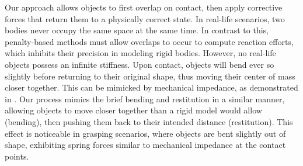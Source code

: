 Our approach allows objects to first overlap on contact, then apply corrective forces that return them to a physically correct state. In real-life scenarios, two bodies never occupy the same space at the same time. In contrast to this, penalty-based methods must allow overlaps to occur to compute reaction efforts, which inhibits their precision in modeling rigid bodies. However, no real-life objects possess an infinite stiffness. Upon contact, objects will bend ever so slightly before returning to their original shape, thus moving their center of mass closer together. This can be mimicked by mechanical impedance, as demonstrated in \cite{jain2011controlling}. Our process mimics the brief bending and restitution in a similar manner, allowing objects to move closer together than a rigid model would allow (bending), then pushing them back to their intended distance (restitution). This effect is noticeable in grasping scenarios, where objects are bent slightly out of shape, exhibiting spring forces similar to mechanical impedance at the contact points.